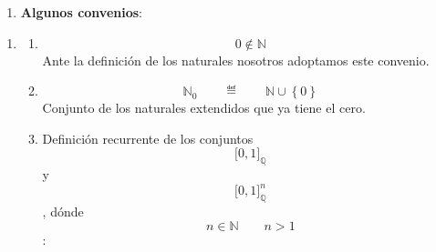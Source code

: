 \documentclass[
]{article}
\author{}
\date{}
\providecommand{\tightlist}{%
  \setlength{\itemsep}{0pt}\setlength{\parskip}{0pt}}
\begin{document}
\begin{enumerate}
\def\labelenumi{\arabic{enumi}.}
\tightlist
\item
  \textbf{Algunos convenios}:
\end{enumerate}

\begin{enumerate}
\def\labelenumi{\arabic{enumi}.}
\item
  \begin{enumerate}
  \def\labelenumii{\arabic{enumii}.}
  \item
    \[0 \notin {\mathbb{N}}\]Ante la definición de los naturales
    nosotros adoptamos este convenio.
  \item
    \[{\mathbb{N}}_{0}{\qquad ≝ \qquad}{{\mathbb{N}} \cup \left\{ 0 \right\}}\]Conjunto
    de los naturales extendidos que ya tiene el cero.
  \item
    Definición recurrente de los
    conjuntos\[\lbrack 0,1\rbrack_{\mathbb{Q}}\]y\[\lbrack 0,1\rbrack_{\mathbb{Q}}^{n}\],
    dónde \[{n \in {\mathbb{N}}}\qquad{n > 1}\]:


\end{enumerate}
\end{enumerate}
\end{document}
